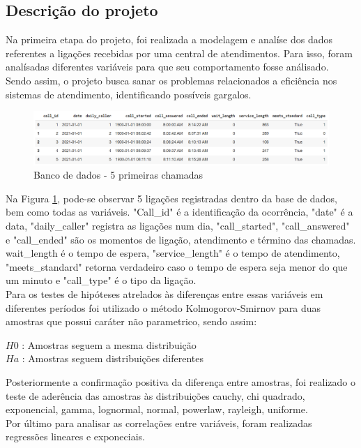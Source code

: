 \subsection{Descrição do projeto}
Na primeira etapa do projeto, foi realizada a modelagem e analíse dos dados referentes a ligações recebidas por uma central de atendimentos. Para isso, foram analísadas diferentes variáveis para que seu comportamento fosse análisado. Sendo assim, o projeto busca sanar os problemas relacionados a eficiência nos sistemas de atendimento, identificando possíveis gargalos.\\
\begin{figure}[H]
    \includegraphics[scale= 0.6]{introducao/imgintro.png}
    \caption{Banco de dados - 5 primeiras chamadas}
    \label{fig: bd_img}
\end{figure}
Na Figura \ref*{fig: bd_img}, pode-se observar 5 ligações registradas dentro da base de dados, bem como todas as variáveis. "Call\_id" é a identificação da ocorrência, "date" é a data, "daily\_caller" registra as ligações num dia, "call\_started", "call\_answered" e "call\_ended" são os momentos de ligação, atendimento e término das chamadas. 
wait\_length é o tempo de espera,  "service\_length" é o tempo de atendimento, "meets\_standard" retorna verdadeiro caso o tempo de espera seja menor do que um minuto e "call\_type" é o tipo da ligação.\\
Para os testes de hipóteses atrelados às diferenças entre essas variáveis em diferentes períodos foi utilizado o método Kolmogorov-Smirnov para duas amostras que possui caráter não parametrico, sendo assim:\\
\begin{center}
$H{0}$ : Amostras seguem a mesma distribuição\\
$H{a}$ : Amostras seguem distribuições diferentes
\end{center}
Posteriormente a confirmação positiva da diferença entre amostras, foi realizado o teste de aderência das amostras às distribuições cauchy, chi quadrado, exponencial, gamma, lognormal, normal, powerlaw, rayleigh, uniforme.\\
Por último para analisar as correlações entre variáveis, foram realizadas regressões lineares e exponeciais.\\

